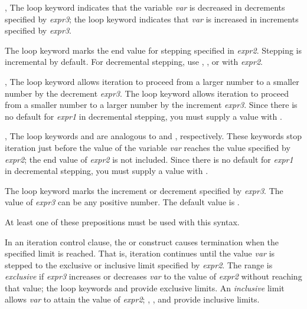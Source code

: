 \begin{new}
\begin{defloop}
\begin{flushdesc}
\item[\cdf{downfrom}, \cdf{upfrom}]
The loop keyword  
indicates that the variable {\it var\/} is decreased in decrements
specified by {\it expr3}; the loop keyword  indicates that 
{\it var\/} is increased in increments specified by {\it expr3}.

\item[\cdf{to}]
The loop keyword  marks the end value for stepping specified in 
{\it expr2}. Stepping is incremental by default.  For
decremental stepping, use ,
, or  with {\it expr2}.

\item[\cdf{downto}, \cdf{upto}]
The loop keyword  allows iteration to proceed
from a larger number to a smaller number by the decrement 
{\it expr3}.  The loop keyword  allows iteration to proceed
from a smaller number to a larger number by the increment {\it expr3}.
Since there is no default for {\it expr1\/} in decremental stepping,
you must supply a value with .

\item[\cdf{below}, \cdf{above}]
The loop keywords  and  are analogous to
 and , respectively.  These keywords stop
iteration just before the value of the variable {\it var} reaches the value 
specified by {\it expr2\/}; the end value of {\it expr2\/} is not included.
Since there is no default for {\it expr1\/} in decremental stepping,
you must supply a value with .

\item[\cdf{by}]
The loop keyword  marks the increment or decrement specified by
{\it expr3}.  The value of {\it expr3\/} can be any positive number.
The default value is .
\end{flushdesc}

At least one of these prepositions must be used with this syntax.

In an iteration control clause, the  or  construct
causes termination when the specified limit is reached.  That is,
iteration continues until the value {\it var\/} is stepped to the
exclusive or inclusive limit specified by {\it expr2\/}.  The range is
{\it exclusive\/} if {\it expr3\/} increases or decreases {\it var\/}
to the value of {\it expr2\/} without reaching that value; the loop
keywords  and  provide exclusive limits.  An
{\it inclusive\/} limit allows {\it var\/} to attain the value of
{\it expr2}; , , and  provide inclusive
limits.


\end{defloop}
\end{new}
